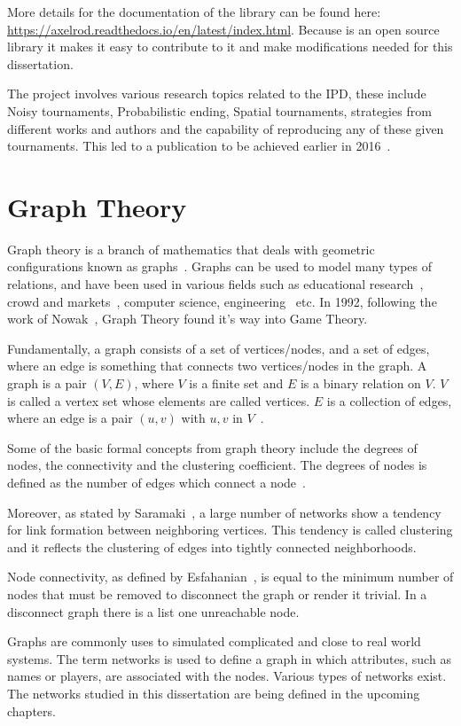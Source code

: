 More details for the documentation of the library can be found here:
\url{https://axelrod.readthedocs.io/en/latest/index.html}.
Because is an open source library it makes it easy to contribute to it and
make modifications needed for this dissertation.

The project involves various research topics related to the IPD, these include
Noisy tournaments, Probabilistic ending, Spatial tournaments, strategies from
different works and authors and the capability of reproducing any of these given
tournaments. This led to a publication to be achieved earlier in 2016~\cite{Knight2016}.

\section{Graph Theory}
Graph theory is a branch of mathematics that deals with geometric configurations
known as graphs~\cite{10.2307/1170318}. Graphs can be used to
model many types of relations, and have been used in various fields such as
educational research~\cite{10.2307/1170318}, crowd and markets~\cite{Easley2010},
computer science, engineering~\cite{Singh2014} etc. In 1992, following the work
of Nowak~\cite{Nowak1992,Nowak1993}, Graph Theory found it's way into Game Theory.

Fundamentally, a graph consists of a set of vertices/nodes, and a set of edges, where
an edge is something that connects two vertices/nodes in the graph. A graph is a pair
$(V,E)$, where \(V\) is a finite set and \(E\) is a binary relation on \(V\). \(V\)
is called a vertex set whose elements are called vertices. \(E\) is a collection
of edges, where an edge is a pair $(u,v)$ with $u,v$ in \(V\)~\cite{Sadavare2012}.

Some of the basic formal concepts from graph theory include the degrees of
nodes, the connectivity and the clustering coefficient. The degrees of nodes is
defined as the number of edges which connect a node~\cite{Sadavare2012}.

Moreover, as stated by Saramaki~\cite{Saramaki2007}, a large number of networks
show a tendency for link formation between neighboring vertices. This tendency is
called clustering and it reflects the clustering of edges into tightly connected
neighborhoods.

Node connectivity, as defined by Esfahanian~\cite{Esfahanian}, is equal to the
minimum number of nodes that must be removed to disconnect the graph or render
it trivial. In a disconnect graph there is a list one unreachable node.

Graphs are commonly uses to simulated complicated and close to real world systems.
The term networks is used to define a graph in which attributes, such as names or
players, are associated with the nodes. Various types of networks exist. The
networks studied in this dissertation are being defined in the upcoming chapters.
